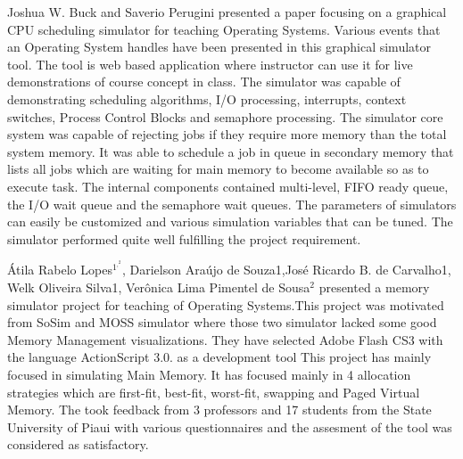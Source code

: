 \begin{onehalfspacing}
\par Joshua W. Buck and Saverio Perugini\cite{Joshua} presented a paper focusing on a graphical CPU scheduling simulator for teaching Operating Systems. Various events that an Operating System handles have been presented in this graphical simulator tool. The tool is web based application where instructor can use it for live demonstrations of course concept in class. The simulator was capable of demonstrating scheduling algorithms, I/O processing, interrupts, context switches, Process Control Blocks and semaphore processing. The simulator core system was capable of rejecting jobs if they require more memory than the total system memory. It was able to schedule a job in queue in secondary memory that lists all jobs which are waiting for main memory to become available so as to execute task. The internal components contained multi-level, FIFO ready queue, the I/O wait queue and the semaphore wait queues. The parameters of simulators can easily be customized and various simulation variables that can be tuned. The simulator performed quite well fulfilling the project requirement.\newline

\par Átila Rabelo Lopes$^1^,^2$, Darielson Araújo de Souza1,José Ricardo B. de Carvalho1, Welk Oliveira Silva1, Verônica Lima Pimentel de Sousa$^2$ \cite{Rabelo} presented a memory simulator project for teaching of Operating Systems.This project was  motivated from SoSim and MOSS simulator where those two simulator lacked some good Memory Management visualizations. They have selected Adobe Flash CS3 with the language ActionScript 3.0. as a development tool This project has mainly focused in simulating Main Memory. It has focused mainly in 4 allocation strategies which are first-fit, best-fit, worst-fit, swapping and Paged Virtual Memory. The took feedback from 3 professors and 17 students from the State University of Piaui with various questionnaires and the assesment of the tool was considered as satisfactory. \newline


\end{onehalfspacing}
